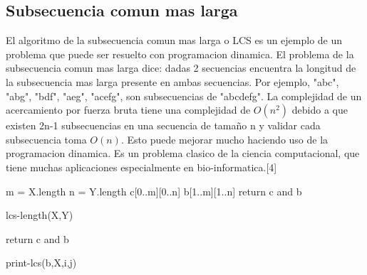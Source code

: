 \documentclass[spanish]{article}
\begin{document}
	\subsection{Subsecuencia comun mas larga}
	El algoritmo de la subsecuencia comun mas larga o LCS es un ejemplo de un problema que puede ser resuelto con programacion dinamica. El problema de la subsecuencia comun mas larga dice: dadas 2 secuencias encuentra la longitud de la subsecuencia mas larga presente en ambas secuencias. Por ejemplo, "abc", "abg", "bdf", "aeg", "acefg", son subsecuencias de "abcdefg". La complejidad de un acercamiento por fuerza bruta tiene una complejidad de $O(n^2)$ debido a que existen 2n-1 subsecuencias en una secuencia de tamaño n y validar cada subsecuencia toma $O(n)$. Esto puede mejorar mucho haciendo uso de la programacion dinamica. Es un problema clasico de la ciencia computacional, que tiene muchas aplicaciones especialmente en bio-informatica.[4]
	\begin{algorithm}[H]
		m = X.length\;
		n = Y.length\;		
		c[0..m][0..n]\;	
		b[1..m][1..n]\;		
		return c and b\;
		\caption{lcs-length(X,Y)}
	\end{algorithm}
	\begin{algorithm}[H]
		return c and b\;
		\caption{print-lcs(b,X,i,j)}
	\end{algorithm}
\end{document}
